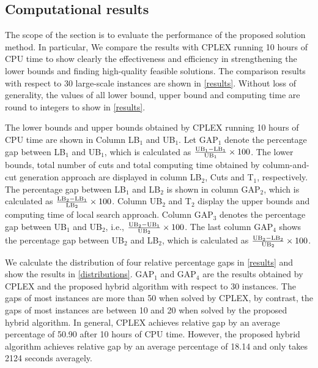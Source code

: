 \documentclass[11pt,nonblindrev,fleqn]{article}
\begin{document}
\subsection{Computational results}
The scope of the section is to evaluate the performance of the proposed solution method. In particular, We compare the results with CPLEX running 10 hours of CPU time to show clearly the effectiveness and efficiency in strengthening the lower bounds and finding high-quality feasible solutions. The comparison results with respect to 30 large-scale instances are shown in \autoref{results}. Without loss of generality, the values of all lower bound, upper bound and computing time are round to integers to show in \autoref{results}.

The lower bounds and upper bounds obtained by CPLEX running 10 hours of CPU time are shown in Column LB$_1$ and UB$_1$. Let GAP$_1$ denote the percentage gap between LB$_1$ and UB$_1$, which is calculated as $\rm \frac{UB_1 - LB_1}{UB_1}\times 100$. The lower bounds, total number of cuts and total computing time obtained by column-and-cut generation approach are displayed in column LB$_2$, Cuts and T$_1$, respectively. The percentage gap between LB$_1$ and LB$_2$ is shown in column GAP$_2$, which is calculated as $\rm \frac{LB_2 - LB_1}{LB_2}\times 100$. Column UB$_2$ and T$_2$ display the upper bounds and computing time of local search approach. Column GAP$_3$ denotes the percentage gap between UB$_1$ and UB$_2$, i.e., $\rm \frac{UB_2 - UB_1}{UB_2}\times 100$. The last column GAP$_4$ shows the percentage gap between UB$_2$ and LB$_2$, which is calculated as $\rm \frac{UB_2 - LB_2}{UB_2}\times 100$.

We calculate the distribution of four relative percentage gaps in \autoref{results} and show the results in \autoref{distributions}. GAP$_1$ and GAP$_4$ are the results obtained by CPLEX and the proposed hybrid algorithm with respect to 30 instances. The gaps of most instances are more than 50 when solved by CPLEX, by contrast, the gaps of most instances are between 10 and 20 when solved by the proposed hybrid algorithm. In general, CPLEX achieves relative gap by an average percentage of 50.90 after 10 hours of CPU time. However, the proposed hybrid algorithm achieves relative gap by an average percentage of 18.14 and only takes 2124 seconds averagely.
\end{document}
